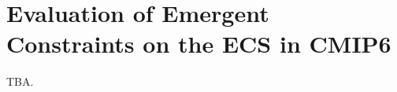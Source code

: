 


\chapter{Evaluation of Emergent Constraints on the \acl{ECS} in \acs{CMIP}6}
\label{ch:05:paper_ecs}

TBA.